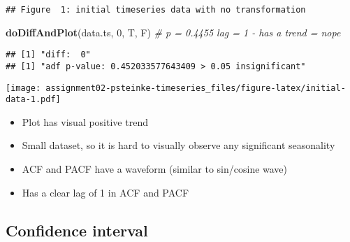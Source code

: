 \documentclass[]{article}
\newenvironment{Shaded}{\begin{snugshade}}{\end{snugshade}}
\newcommand{\CommentTok}[1]{\textcolor[rgb]{0.56,0.35,0.01}{\textit{#1}}}
\newcommand{\DataTypeTok}[1]{\textcolor[rgb]{0.13,0.29,0.53}{#1}}
\newcommand{\DecValTok}[1]{\textcolor[rgb]{0.00,0.00,0.81}{#1}}
\newcommand{\KeywordTok}[1]{\textcolor[rgb]{0.13,0.29,0.53}{\textbf{#1}}}
\newcommand{\NormalTok}[1]{#1}
\newcommand{\OperatorTok}[1]{\textcolor[rgb]{0.81,0.36,0.00}{\textbf{#1}}}
\newcommand{\StringTok}[1]{\textcolor[rgb]{0.31,0.60,0.02}{#1}}
\providecommand{\tightlist}{%
  \setlength{\itemsep}{0pt}\setlength{\parskip}{0pt}}
\begin{document}
\begin{Shaded}
\end{Shaded}

\begin{verbatim}
## Figure  1: initial timeseries data with no transformation
\end{verbatim}

\begin{Shaded}
\begin{Highlighting}[]
\KeywordTok{doDiffAndPlot}\NormalTok{(data.ts, }\DecValTok{0}\NormalTok{, T, F) }\CommentTok{# p = 0.4455 lag = 1 - has a trend = nope}
\end{Highlighting}
\end{Shaded}

\begin{verbatim}
## [1] "diff:  0"
## [1] "adf p-value: 0.452033577643409 > 0.05 insignificant"
\end{verbatim}

\texttt{[image: assignment02-psteinke-timeseries\_files/figure-latex/initial-data-1.pdf]}

\begin{itemize}
\tightlist
\item
  Plot has visual positive trend
\item
  Small dataset, so it is hard to visually observe any significant
  seasonality
\item
  ACF and PACF have a waveform (similar to sin/cosine wave)
\item
  Has a clear lag of 1 in ACF and PACF
\end{itemize}

\hypertarget{confidence-interval}{%
\subsection{Confidence interval}\label{confidence-interval}}

\begin{Shaded}
\end{Shaded}
\end{document}
